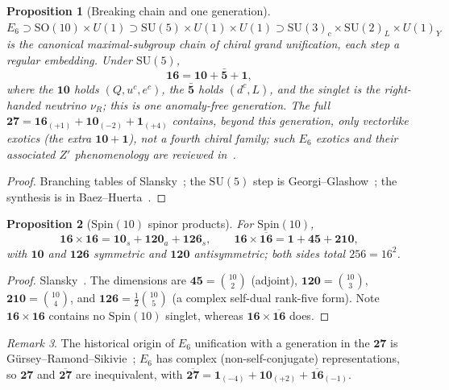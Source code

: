 \documentclass[aps,prresearch,onecolumn,amsmath,amssymb,nofootinbib]{revtex4-2}
\theoremstyle{plain}\newtheorem{theorem}{Theorem}[section]\newtheorem{proposition}[theorem]{Proposition}\newtheorem{lemma}[theorem]{Lemma}\newtheorem{corollary}[theorem]{Corollary}
\theoremstyle{definition}\newtheorem{definition}[theorem]{Definition}\newtheorem{conjecture}[theorem]{Conjecture}
\theoremstyle{remark}\newtheorem{remark}[theorem]{Remark}
\begin{document}
\begin{proposition}[Breaking chain and one generation]
\label{prop:chain}
$E_6\supset\mathrm{SO}(10)\times U(1)\supset\mathrm{SU}(5)\times U(1)\times U(1)\supset\mathrm{SU}(3)_c\times\mathrm{SU}(2)_L\times U(1)_Y$ is the canonical maximal-subgroup chain of chiral grand unification, each step a regular embedding. Under $\mathrm{SU}(5)$,
\begin{equation}
\mathbf{16}=\mathbf{10}+\bar{\mathbf 5}+\mathbf 1,
\end{equation}
where the $\mathbf{10}$ holds $(Q,u^c,e^c)$, the $\bar{\mathbf 5}$ holds $(d^c,L)$, and the singlet is the right-handed neutrino $\nu_R$; this is one anomaly-free generation. The full $\mathbf{27}=\mathbf{16}_{(+1)}+\mathbf{10}_{(-2)}+\mathbf{1}_{(+4)}$ contains, beyond this generation, only vectorlike exotics (the extra $\mathbf{10}+\mathbf{1}$), not a fourth chiral family; such $E_6$ exotics and their associated $Z'$ phenomenology are reviewed in~\cite{Langacker2008}.
\end{proposition}

\begin{proof}
Branching tables of Slansky~\cite{Slansky1981}; the $\mathrm{SU}(5)$ step is Georgi--Glashow~\cite{GeorgiGlashow1974}; the synthesis is in Baez--Huerta~\cite{BaezHuerta2010}.
\end{proof}

\begin{proposition}[$\mathrm{Spin}(10)$ spinor products]
\label{prop:so10prod}
For $\mathrm{Spin}(10)$,
\begin{equation}
\mathbf{16}\times\mathbf{16}=\mathbf{10}_s+\mathbf{120}_a+\mathbf{126}_s,\qquad \mathbf{16}\times\overline{\mathbf{16}}=\mathbf{1}+\mathbf{45}+\mathbf{210},
\end{equation}
with $\mathbf{10}$ and $\mathbf{126}$ symmetric and $\mathbf{120}$ antisymmetric; both sides total $256=16^2$.
\end{proposition}

\begin{proof}
Slansky~\cite[Table~42]{Slansky1981}. The dimensions are $\mathbf{45}=\binom{10}{2}$ (adjoint), $\mathbf{120}=\binom{10}{3}$, $\mathbf{210}=\binom{10}{4}$, and $\mathbf{126}=\tfrac12\binom{10}{5}$ (a complex self-dual rank-five form). Note $\mathbf{16}\times\mathbf{16}$ contains no $\mathrm{Spin}(10)$ singlet, whereas $\mathbf{16}\times\overline{\mathbf{16}}$ does.
\end{proof}

\begin{remark}
The historical origin of $E_6$ unification with a generation in the $\mathbf{27}$ is G\"ursey--Ramond--Sikivie~\cite{GRS1976}; $E_6$ has complex (non-self-conjugate) representations, so $\mathbf{27}$ and $\overline{\mathbf{27}}$ are inequivalent, with $\overline{\mathbf{27}}=\mathbf{1}_{(-4)}+\mathbf{10}_{(+2)}+\overline{\mathbf{16}}_{(-1)}$.
\end{remark}
\end{document}
